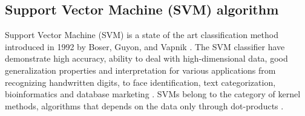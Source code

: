 

\subsection{Support Vector Machine (SVM) algorithm}

Support Vector Machine (SVM) is a state of the art classification method introduced in 1992 by Boser, Guyon, and Vapnik \cite{Boser1992,Cortes1995}. The SVM classifier have demonstrate high accuracy, ability to deal with high-dimensional data, good generalization properties and interpretation for various applications from recognizing handwritten digits, to face identification, text categorization, bioinformatics and database marketing \cite{Wang2002,Yang1999,Heisele2001,Sadri2003,Campbell2011}. SVMs belong to the category of kernel methods, algorithms that depends on the data only through dot-products \cite{Schlkopf2013}.

